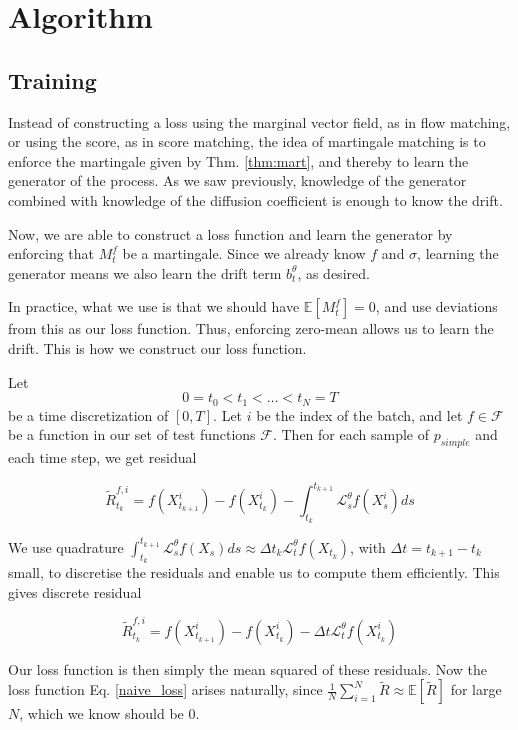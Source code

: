 \documentclass[12pt]{article}
\theoremstyle{break}
\begin{document}
\section{Algorithm}
\subsection{Training}
Instead of constructing a loss using the marginal vector field, as in flow matching, or using the score, as in score matching, the idea of martingale matching is to enforce the martingale given by Thm. \ref{thm:mart}, and thereby to learn the generator of the process. As we saw previously, knowledge of the generator combined with knowledge of the diffusion coefficient is enough to know the drift.

Now, we are able to construct a loss function and learn the generator by enforcing that $M_t^f$ be a martingale. Since we already know $f$ and $\sigma$, learning the generator means we also learn the drift term $b_t^{\theta}$, as desired.

In practice, what we use is that we should have $\mathbb{E}[M_t^f] = 0$, and use deviations from this as our loss function. Thus, enforcing zero-mean allows us to learn the drift. This is how we construct our loss function.

Let 
\begin{equation*}
	0 = t_0 < t_1 < \ldots < t_N = T
\end{equation*}
be a time discretization of $[0,T]$. Let $i$ be the index of the batch, and let $f \in \mathcal{F}$ be a function in our set of test functions $\mathcal{F}$. Then for each sample of $p_{simple}$ and each time step, we get residual

\begin{equation*}
	\tilde R_{t_k}^{f,i} = f(X_{t_{k+1}}^i) - f(X_{t_k}^i) - \int_{t_k}^{t_{k+1}}\mathcal{L}_s^\theta f(X_s^i)ds
\end{equation*}

We use quadrature $\int_{t_k}^{t_{k+1}}\mathcal{L}_s^\theta f(X_s) ds \approx \Delta t_k \mathcal{L}_t^\theta f(X_{t_k})$, with $\Delta t = t_{k+1} - t_k$ small, to discretise the residuals and enable us to compute them efficiently. This gives discrete residual 

\begin{equation*}
	\tilde R_{t_k}^{f,i} = f(X_{t_{k+1}}^i) - f(X_{t_k}^i) - \Delta t \mathcal{L}_t^\theta f(X_{t_k}^i)
\end{equation*}

Our loss function is then simply the mean squared of these residuals. Now the loss function Eq. \ref{naive_loss} arises naturally, since $\frac{1}{N}\sum_{i=1}^N \tilde R \approx \mathbb{E}[\tilde R]$ for large $N$, which we know should be $0$.
\end{document}

